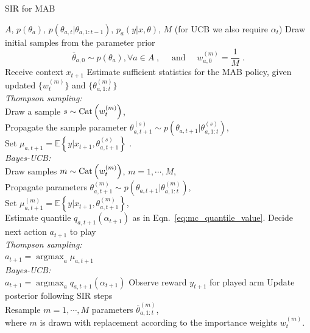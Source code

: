\documentclass{article}
\newcommand{\eValue}[1]{\mathbb{E}\left\{ #1 \right\}}
\newcommand{\Cat}[1]{{\rm Cat}\left( #1\right)}
\newcommand{\argmax}{\mathop{\mathrm{argmax}}}
\begin{document}
\begin{algorithm}
	\caption{SIR for MAB}
	\label{alg:sir-mab}
	\begin{algorithmic}[1]
		\REQUIRE $A$, $p(\theta_a)$, $p(\theta_{a,t}|\theta_{a,1:t-1})$, $p_a(y|x,\theta)$, $M$ (for UCB we also require $\alpha_t$)
		\STATE Draw initial samples from the parameter prior
		\begin{equation}
		\overline{\theta}_{a,0} \sim p(\theta_a), \forall a \in A \;, \quad \text{ and } \quad w_{a,0}^{(m)}=\frac{1}{M} \; .
		\nonumber
		\end{equation}
		\STATE Receive context $x_{t+1}$
		\STATE Estimate sufficient statistics for the MAB policy, given updated $\{w_t^{(m)} \}$ and $\{\theta_{a,1:t}^{(m)}\}$\\
		\small
		\quad \textit{Thompson sampling:}\\
		\qquad Draw a sample $s \sim \Cat{w_t^{(m)}}$, \\
		\qquad Propagate the sample parameter $\theta_{a,t+1}^{(s)}\sim p(\theta_{a,t+1}|\theta_{a,1:t}^{(s)})$, \\
		\qquad Set $\mu_{a,t+1}=\eValue{y|x_{t+1}, \theta_{a,t+1}^{(s)}}$ .\\
		\quad \textit{Bayes-UCB:}\\
		\qquad Draw samples $m \sim \Cat{w_t^{(m)}}$, $m=1,\cdots, M$,\\
		\qquad Propagate parameters $\theta_{a,t+1}^{(m)} \sim p(\theta_{a,t+1}|\theta_{a,1:t}^{(m)})$, \\
		\qquad Set $\mu_{a,t+1}^{(m)}=\eValue{y|x_{t+1}, \theta_{a,t+1}^{(m)}}$,\\
		\qquad Estimate quantile $q_{a,t+1}(\alpha_{t+1})$ as in Eqn.~\eqref{eq:mc_quantile_value}.
		\normalsize
		\ENDFOR
		\STATE Decide next action $a_{t+1}$ to play\\
		\small
		\quad \textit{Thompson sampling:}\\
		\qquad $a_{t+1}=\argmax_a \mu_{a,t+1}$ \\
		\quad \textit{Bayes-UCB:} \\
		\qquad $a_{t+1}=\argmax_{a}q_{a,t+1}(\alpha_{t+1})$
		\normalsize
		\STATE Observe reward $y_{t+1}$ for played arm
		\STATE Update posterior following SIR steps\\
		\small
		\quad Resample $m=1,\cdots, M$ parameters $\overline{\theta}_{a,1:t}^{(m)}$, \\
		\quad \quad where $m$ is drawn with replacement according to the importance weights $w_t^{(m)}$.\\

\end{algorithmic}
\end{algorithm}
\end{document}
